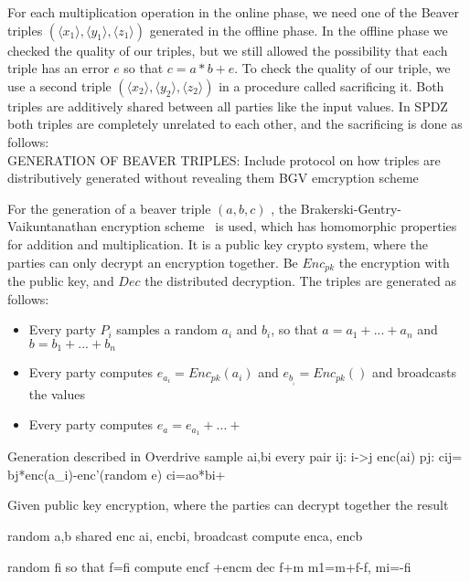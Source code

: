 \documentclass[english,runningheads,a4paper]{llncs}[2018/03/10]
\begin{document}
For each multiplication operation in the online phase, we need one of the Beaver triples \( (\langle x_1 \rangle ,\langle y_1\rangle , \langle z_1\rangle )\) generated in the offline phase. In the offline phase we checked the quality of our triples, but we still allowed the possibility that each triple has an error \(e\) so that \(c=a*b+e\). To check the quality of our triple, we use a second triple \( (\langle x_2 \rangle ,\langle y_2\rangle ,\langle z_2\rangle )\) in a procedure called sacrificing it. Both triples are additively shared between all parties like the input values. In SPDZ both triples are completely unrelated to each other, and the sacrificing is done as follows:\\


GENERATION OF BEAVER TRIPLES: Include protocol on how triples are distributively generated without revealing them
BGV emcryption scheme

For the generation of a beaver triple $(a,b,c)$ , the Brakerski-Gentry-Vaikuntanathan encryption scheme~\cite{cryptoeprint:2011:277} is used, which has homomorphic properties for addition and multiplication. It is a public key crypto system, where the parties can only decrypt an encryption together. Be $Enc_{pk}$ the encryption with the public key, and $Dec$ the distributed decryption. The triples are generated as follows:

\begin{itemize}
\item Every party $P_i$ samples a random $a_i$ and $b_i$, so that $a=a_1+...+a_n$ and $b=b_1+...+b_n$
\item Every party computes $e_{a_i}=Enc_{pk}(a_i)$ and $e_{b__i}=Enc_{pk}()$ and broadcasts the values
\item Every party computes $e_a=e_{a_1}+...+$

\end{itemize}


Generation described in Overdrive
sample ai,bi
every pair ij:
i->j enc(ai)
pj: cij= bj*enc(a_i)-enc'(random e)
ci=ao*bi+



Given public key encryption, where the parties can decrypt together the result

random a,b shared
enc ai, encbi, broadcast
compute enca, encb


random fi so that f=fi
compute encf +encm
dec f+m
m1=m+f-f, mi=-fi
\end{document}

